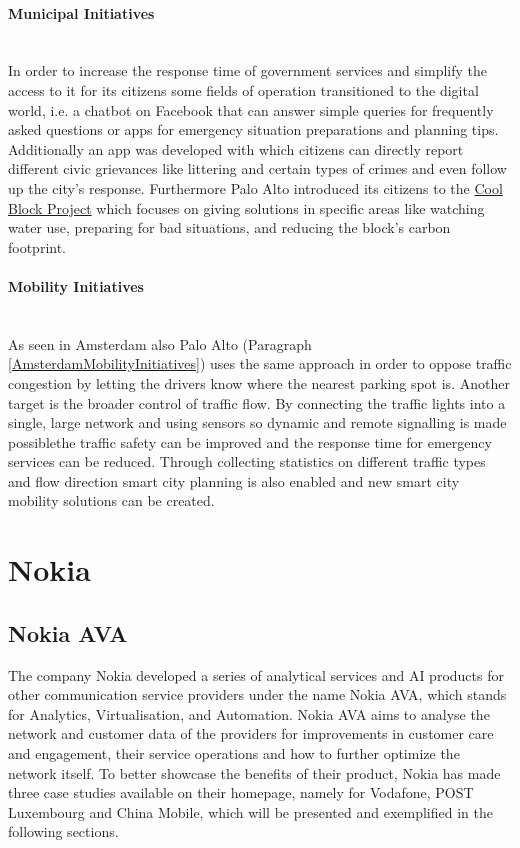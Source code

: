 \documentclass[a4paper,12pt]{report}
\begin{document}
		\paragraph{Municipal Initiatives} \hfill \\
		In order to increase the response time of government services and simplify the access to it for its citizens some fields of operation transitioned to the digital world, i.e. a chatbot on Facebook that can answer simple queries for frequently asked questions or apps for emergency situation preparations and planning tips. Additionally an app was developed with which citizens can directly report different civic grievances like littering and certain types of crimes and even follow up the city's response. Furthermore Palo Alto introduced its citizens to the \href{https://coolblock.org/}{Cool Block Project} which focuses on giving solutions in specific areas like watching water use, preparing for bad situations, and reducing the block's carbon footprint.	
		\paragraph{Mobility Initiatives} \hfill \\
		As seen in Amsterdam also Palo Alto (Paragraph \ref{AmsterdamMobilityInitiatives}) uses the same approach in order to oppose traffic congestion by letting the drivers know where the nearest parking spot is. Another target is the broader control of traffic flow. By connecting the traffic lights into a single, large network and using sensors so dynamic and remote signalling is made possiblethe traffic safety can be improved and the response time for emergency services can be reduced. Through collecting statistics on different traffic types and flow direction smart city planning is also enabled and new smart city mobility solutions can be created.
	\closesection
	
	\section{Nokia}
	\startsection
		\subsection[Nokia AVA]{Nokia AVA \cite{NokiaAVACrowdAnalytics}}
		\startsubsection
			The company Nokia developed a series of analytical services and AI products for other communication service providers under the name Nokia AVA, which stands for Analytics, Virtualisation, and Automation. Nokia AVA aims to analyse the network and customer data of the providers for improvements in customer care and engagement, their service operations and how to further optimize the network itself.
			To better showcase the benefits of their product, Nokia has made three case studies available on their homepage, namely for Vodafone, POST Luxembourg and China Mobile, which will be presented and exemplified in the following sections.
\end{document}
